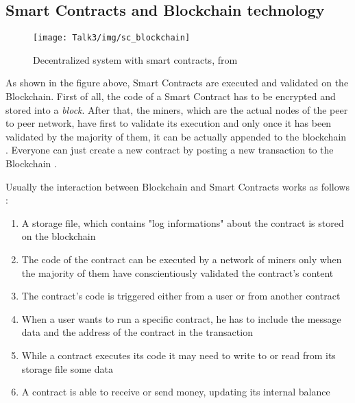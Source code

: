 




\subsection{Smart Contracts and Blockchain technology}
           \begin{figure}[H]
         \begin{center}
         \texttt{[image: Talk3/img/sc\_blockchain]}
         \end{center}
         \caption{Decentralized system with smart contracts, from \cite{paper3}}
         \label{label}
       \end{figure}

As shown in the figure above, Smart Contracts are executed and validated on the Blockchain. First of all, the code of a Smart Contract has to be encrypted \cite{yo} and stored into a \textit{block}. 
After that, the miners, which are the actual nodes of the peer to peer network, have first to validate its execution and only once it has been validated by the majority of them, it can be actually appended to the blockchain \cite{SC2}. 
Everyone can just create a new contract by posting a new transaction to the Blockchain \cite{paper3}.

Usually the interaction between Blockchain and Smart Contracts works as follows \cite{paper3}: 

\begin{enumerate}
\item A storage file, which contains "log informations" about the contract is stored on the blockchain 
\item The code of the contract can be executed by a network of miners only when the majority of them have conscientiously validated the contract's content
\item The contract's code is triggered either from a user or from another contract
\item When a user wants to run a specific contract, he has to include the message data and the address of the contract in the transaction   
\item While a contract executes its code it may need to write to or read from its storage file some data 
\item A contract is able to receive or send money, updating its internal balance
\end{enumerate}

